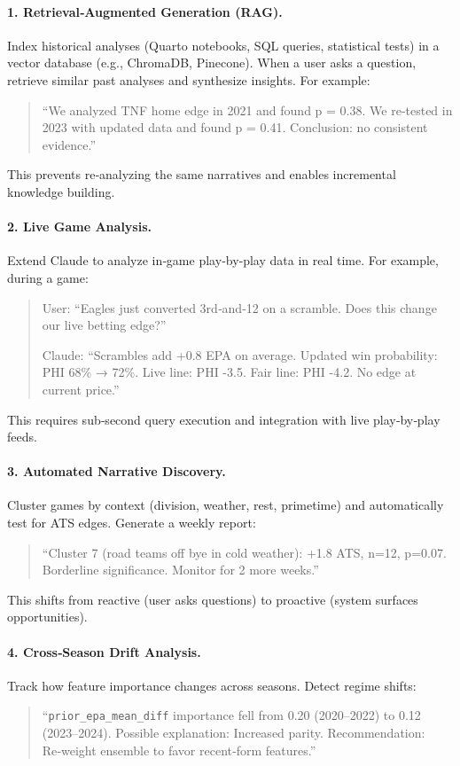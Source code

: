 \paragraph{1. Retrieval‑Augmented Generation (RAG).}
Index historical analyses (Quarto notebooks, SQL queries, statistical tests) in a vector database (e.g., ChromaDB, Pinecone). When a user asks a question, retrieve similar past analyses and synthesize insights. For example:
\begin{quote}
``We analyzed TNF home edge in 2021 and found p = 0.38. We re‑tested in 2023 with updated data and found p = 0.41. Conclusion: no consistent evidence.''
\end{quote}

This prevents re‑analyzing the same narratives and enables incremental knowledge building.

\paragraph{2. Live Game Analysis.}
Extend Claude to analyze in‑game play‑by‑play data in real time. For example, during a game:
\begin{quote}
User: ``Eagles just converted 3rd‑and‑12 on a scramble. Does this change our live betting edge?''

Claude: ``Scrambles add +0.8 EPA on average. Updated win probability: PHI 68\% → 72\%. Live line: PHI -3.5. Fair line: PHI -4.2. No edge at current price.''
\end{quote}

This requires sub‑second query execution and integration with live play‑by‑play feeds.

\paragraph{3. Automated Narrative Discovery.}
Cluster games by context (division, weather, rest, primetime) and automatically test for ATS edges. Generate a weekly report:
\begin{quote}
``Cluster 7 (road teams off bye in cold weather): +1.8 ATS, n=12, p=0.07. Borderline significance. Monitor for 2 more weeks.''
\end{quote}

This shifts from reactive (user asks questions) to proactive (system surfaces opportunities).

\paragraph{4. Cross‑Season Drift Analysis.}
Track how feature importance changes across seasons. Detect regime shifts:
\begin{quote}
``\texttt{prior\_epa\_mean\_diff} importance fell from 0.20 (2020--2022) to 0.12 (2023--2024). Possible explanation: Increased parity. Recommendation: Re‑weight ensemble to favor recent‑form features.''
\end{quote}

